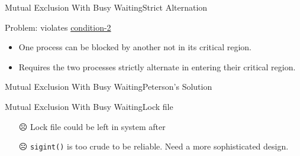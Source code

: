 \begin{frame}{Mutual Exclusion With Busy Waiting}{Strict Alternation}
  \begin{center}
  \end{center}
  \begin{block}{Problem: violates \hyperlink{cond}{condition-2}}
    \begin{itemize}
    \item One process can be blocked by another not in its critical region.
    \item Requires the two processes strictly alternate in entering their critical region.
    \end{itemize}
  \end{block}
\end{frame}

\begin{frame}{Mutual Exclusion With Busy Waiting}{Peterson's Solution}
  \begin{center}
  \end{center}
  \begin{refsection}
    \nocite{wiki:peterson}
    \printbibliography[heading=none]
  \end{refsection}
\end{frame}

\begin{frame}{Mutual Exclusion With Busy Waiting}{Lock file}
  \begin{itemize}
  \item[☹] Lock file could be left in system after 
  \end{itemize}
\end{frame}

\begin{frame}
  \begin{itemize}
  \item[☹] \texttt{sigint()} is too crude to be reliable. Need a more sophisticated design.
  \end{itemize}
\end{frame}

